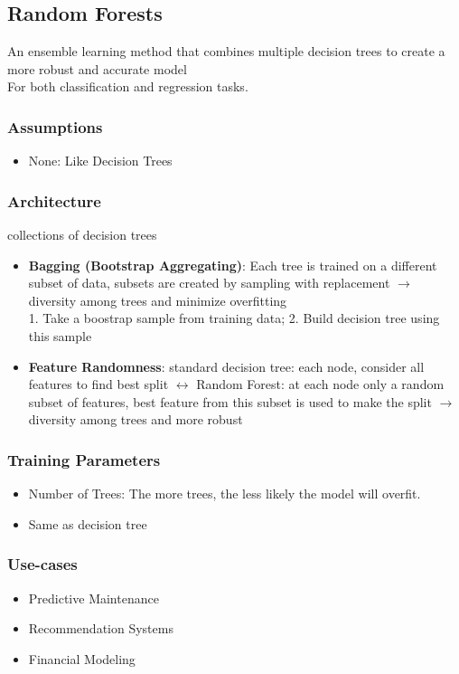 \documentclass[english]{latex4ei/latex4ei_sheet}
\begin{document}
\begin{sectionbox}
\subsection{Random Forests}
An ensemble learning method that combines multiple decision trees to create a more robust and accurate model\\
For both classification and regression tasks.

\subsubsection{Assumptions}
\begin{itemize}
    \item None: Like Decision Trees
\end{itemize}

\subsubsection{Architecture}
collections of decision trees
\begin{itemize}
    \item \textbf{Bagging (Bootstrap Aggregating)}: Each tree is trained on a different subset of data, subsets are created by sampling with replacement $\rightarrow$ diversity among trees and minimize overfitting\\
    1. Take a boostrap sample from training data; 2. Build decision tree using this sample
    \item \textbf{Feature Randomness}: standard decision tree: each node, consider all features to find best split $\leftrightarrow$ Random Forest: at each node only a random subset of features, best feature from this subset is used to make the split $\rightarrow$ diversity among trees and more robust
\end{itemize}

\subsubsection{Training Parameters}
\begin{itemize}
    \item Number of Trees: The more trees, the less likely the model will overfit.
    \item Same as decision tree
\end{itemize}

\subsubsection{Use-cases}
\begin{itemize}
    \item Predictive Maintenance
    \item Recommendation Systems
    \item Financial Modeling
\end{itemize}


\end{sectionbox}
\end{document}
